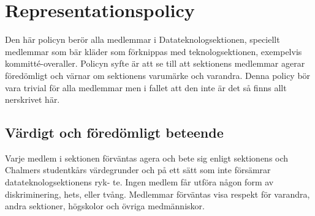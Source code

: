 \section{Representationspolicy}
Den här policyn berör alla medlemmar i Datateknologsektionen, speciellt medlemmar som
bär kläder som förknippas med teknologsektionen, exempelvis kommitté-overaller. Policyn
syfte är att se till att sektionens medlemmar agerar föredömligt och värnar om sektionens
varumärke och varandra. Denna policy bör vara trivial för alla medlemmar men i fallet att
den inte är det så finns allt nerskrivet här.

\subsection{Värdigt och föredömligt beteende}
Varje medlem i sektionen förväntas agera och bete sig enligt sektionens och Chalmers
studentkårs värdegrunder och på ett sätt som inte försämrar datateknologsektionens ryk-
te. Ingen medlem får utföra någon form av diskriminering, hets, eller tvång. Medlemmar
förväntas visa respekt för varandra, andra sektioner, högskolor och övriga medmänniskor.